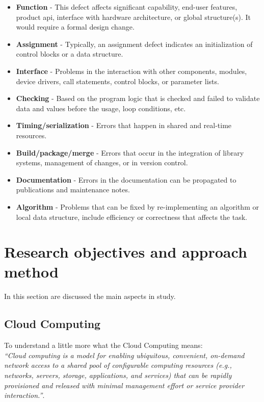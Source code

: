 \begin{itemize}
	\item \textbf{Function} - This defect affects significant capability, end-user features, product \acl{api}, interface with hardware architecture, or global structure(s). It would require a formal design change.
	\item \textbf{Assignment} - Typically, an assignment defect indicates an initialization of control blocks or a data structure.
	\item \textbf{Interface} - Problems in the interaction with other components, modules, device drivers, call statements, control blocks, or parameter lists.
	\item \textbf{Checking} - Based on the program logic that is checked and failed to validate data and values before the usage, loop conditions, etc.
	\item \textbf{Timing/serialization} - Errors that happen in shared and real-time resources.
	\item \textbf{Build/package/merge} - Errors that occur in the integration of library systems, management of changes, or in version control.
	\item \textbf{Documentation} - Errors in the documentation can be propagated to publications and maintenance notes.
	\item \textbf{Algorithm} - Problems that can be fixed by re-implementing an algorithm or local data structure, include efficiency or correctness that affects the task.
\end{itemize}


\newpage
\section{Research objectives and approach method}

In this section are discussed the main aspects in study.

\subsection{Cloud Computing}



To understand a little more what the Cloud Computing means:\\

\textit{``Cloud computing is a model for enabling ubiquitous, convenient, on-demand network access to a shared pool of configurable computing resources (e.g., networks, servers, storage, applications, and services) that can be rapidly provisioned and released with minimal management effort or service provider interaction.''}\cite{mell2011nist}.\\

